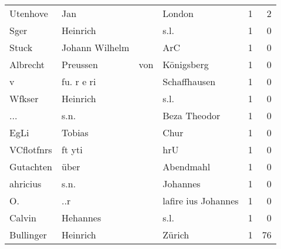 \begin{center}
\begin{tiny}
\begin{longtabu}{llllrr}
                 Utenhove &                                Jan &             &                                      London &          1 &         2 \\
                     Sger &                           Heinrich &             &                                        s.l. &          1 &         0 \\
                    Stuck &                     Johann Wilhelm &             &                                         ArC &          1 &         0 \\
                 Albrecht &                           Preussen &         von &                                  Königsberg &          1 &         0 \\
                        v &                         fu. r e ri &             &                                Schaffhausen &          1 &         0 \\
                   Wfkser &                           Heinrich &             &                                        s.l. &          1 &         0 \\
                      ... &                               s.n. &             &                                Beza Theodor &          1 &         0 \\
                     EgLi &                             Tobias &             &                                        Chur &          1 &         0 \\
               VCflotfnrs &                             ft yti &             &                                         hrU &          1 &         0 \\
                Gutachten &                               über &             &                                   Abendmahl &          1 &         0 \\
                 ahricius &                               s.n. &             &                                    Johannes &          1 &         0 \\
                       O. &                                ..r &             &                         lafire ius Johannes &          1 &         0 \\
                   Calvin &                           Hehannes &             &                                        s.l. &          1 &         0 \\
                Bullinger &                           Heinrich &             &                                      Zürich &          1 &        76 \\

\end{longtabu}
\end{tiny}
\end{center}

